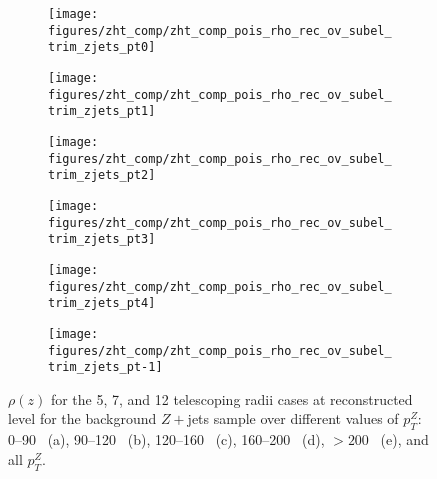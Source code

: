 \begin{figure}[!htbp]\captionsetup{justification=centering}
\begin{center}
\begin{subfigure}[t]{16pc}\centering\texttt{[image: figures/zht\_comp/zht\_comp\_pois\_rho\_rec\_ov\_subel\_trim\_zjets\_pt0]}\caption{}\end{subfigure}
\begin{subfigure}[t]{16pc}\centering\texttt{[image: figures/zht\_comp/zht\_comp\_pois\_rho\_rec\_ov\_subel\_trim\_zjets\_pt1]}\caption{}\end{subfigure}
\begin{subfigure}[t]{16pc}\centering\texttt{[image: figures/zht\_comp/zht\_comp\_pois\_rho\_rec\_ov\_subel\_trim\_zjets\_pt2]}\caption{}\end{subfigure}
\begin{subfigure}[t]{16pc}\centering\texttt{[image: figures/zht\_comp/zht\_comp\_pois\_rho\_rec\_ov\_subel\_trim\_zjets\_pt3]}\caption{}\end{subfigure}
\begin{subfigure}[t]{16pc}\centering\texttt{[image: figures/zht\_comp/zht\_comp\_pois\_rho\_rec\_ov\_subel\_trim\_zjets\_pt4]}\caption{}\end{subfigure}
\begin{subfigure}[t]{16pc}\centering\texttt{[image: figures/zht\_comp/zht\_comp\_pois\_rho\_rec\_ov\_subel\_trim\_zjets\_pt-1]}\caption{}\end{subfigure}
\caption{\label{fig:comprhozjetsrec} $\rho\left(z\right)$ for the 5, 7, and 12 telescoping radii cases at reconstructed level for the background $Z+$jets sample over different values of $p_T^Z$: 0--90 \GeV\ (a), 90--120 \GeV\ (b), 120--160 \GeV\ (c), 160--200 \GeV\ (d), $>200$ \GeV\ (e), and all $p_T^Z$.}
\end{center}
\end{figure}
\clearpage


